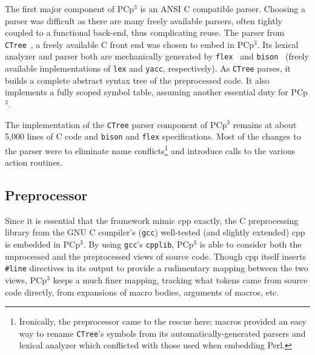 \documentclass{article}
\newcommand{\pcp}{\mbox{\textsf{PCp}$^3$}}
\newcommand{\Cpp}{\mbox{\textsf{cpp}}}
\newcommand{\Perl}{\mbox{Perl}}
\newcommand{\C}{\mbox{C}}
\newcommand{\ppd}[1]{\texttt{\##1}}
\newcommand{\etc}{etc}  %
\begin{document}
The first major component of \pcp{} is an ANSI \C{} compatible parser.
Choosing a parser was difficult as there are many freely available
parsers, often tightly coupled to a functional back-end, thus complicating
reuse.  The parser from \texttt{CTree}~\cite{CTree}, a freely available
\C{} front end was chosen to embed in \pcp{}.  Its lexical analyzer and
parser both are mechanically generated by
\texttt{flex}~\cite{Flex,Levine92} and
\texttt{bison}~\cite{Bison,Levine92} (freely available implementations
of \texttt{lex} and \texttt{yacc}, respectively).  
As \texttt{CTree} parses, it builds a complete abstract syntax tree of
the preprocessed code.  It also implements a fully scoped symbol table,
assuming another essential duty for \pcp{}.

The implementation of the \texttt{CTree} parser component of \pcp{}
remains at about 5,000 lines of \C{} code and \texttt{bison} and
\texttt{flex} specifications.  Most of the changes to the parser were to
eliminate name conflicts\footnote{Ironically, the preprocessor came to the
  rescue here; macros provided an easy way to rename \texttt{CTree}'s
  symbols from its automatically-generated parsers and lexical analyzer
  which conflicted with those used when embedding \Perl{}.}  and
introduce calls to the various action routines.

\subsection{Preprocessor}


Since it is essential that the framework mimic \Cpp{}
exactly, the \C{} preprocessing library from the GNU \C{}
compiler's (\texttt{gcc}) well-tested (and slightly extended)
\Cpp{}~\cite{GCC} is embedded in \pcp{}.  By using \texttt{gcc}'s
\texttt{cpplib}, \pcp{} is able to consider both the unprocessed and
the preprocessed views of source code.  Though \Cpp{} itself inserts
\ppd{line} directives in its output to provide a rudimentary mapping
between the two views, \pcp{} keeps a much finer mapping, tracking
what tokens came from source code directly, from expansions of macro
bodies, arguments of macros, \etc.
\end{document}
